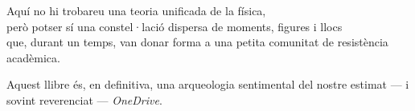 \medskip

\noindent
Aquí no hi trobareu una teoria unificada de la física,\\
però potser sí una constel·lació dispersa de moments, figures i llocs\\
que, durant un temps, van donar forma a una petita comunitat de resistència acadèmica.\\

\medskip

\noindent
Aquest llibre és, en definitiva, una arqueologia sentimental del nostre estimat — i sovint reverenciat — \textit{OneDrive}.

\cleardoublepage

\tableofcontents